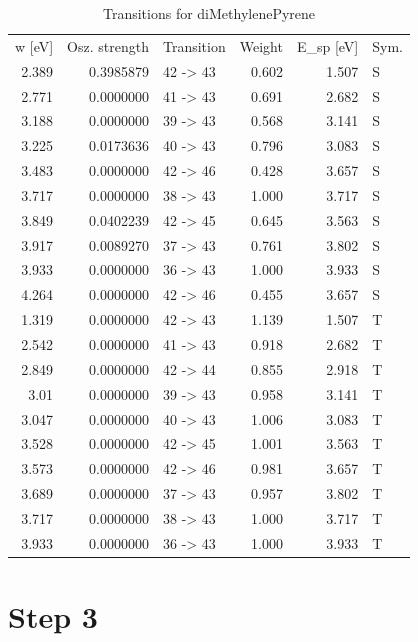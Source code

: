 \begin{table}[htbp]
  \centering
  \caption{Transitions for diMethylenePyrene}
    \begin{tabular}{rrlrrl}
    \multicolumn{1}{l}{w [eV]} & \multicolumn{1}{l}{Osz. strength} & Transition & \multicolumn{1}{l}{Weight} & \multicolumn{1}{l}{E\_sp [eV]} & Sym. \\
    2.389 & 0.3985879 & 42 -> 43 & 0.602 & 1.507 & S \\
    2.771 & 0.0000000 & 41 -> 43 & 0.691 & 2.682 & S \\
    3.188 & 0.0000000 & 39 -> 43 & 0.568 & 3.141 & S \\
    3.225 & 0.0173636 & 40 -> 43 & 0.796 & 3.083 & S \\
    3.483 & 0.0000000 & 42 -> 46 & 0.428 & 3.657 & S \\
    3.717 & 0.0000000 & 38 -> 43 & 1.000 & 3.717 & S \\
    3.849 & 0.0402239 & 42 -> 45 & 0.645 & 3.563 & S \\
    3.917 & 0.0089270 & 37 -> 43 & 0.761 & 3.802 & S \\
    3.933 & 0.0000000 & 36 -> 43 & 1.000 & 3.933 & S \\
    4.264 & 0.0000000 & 42 -> 46 & 0.455 & 3.657 & S \\
    1.319 & 0.0000000 & 42 -> 43 & 1.139 & 1.507 & T \\
    2.542 & 0.0000000 & 41 -> 43 & 0.918 & 2.682 & T \\
    2.849 & 0.0000000 & 42 -> 44 & 0.855 & 2.918 & T \\
    3.01  & 0.0000000 & 39 -> 43 & 0.958 & 3.141 & T \\
    3.047 & 0.0000000 & 40 -> 43 & 1.006 & 3.083 & T \\
    3.528 & 0.0000000 & 42 -> 45 & 1.001 & 3.563 & T \\
    3.573 & 0.0000000 & 42 -> 46 & 0.981 & 3.657 & T \\
    3.689 & 0.0000000 & 37 -> 43 & 0.957 & 3.802 & T \\
    3.717 & 0.0000000 & 38 -> 43 & 1.000 & 3.717 & T \\
    3.933 & 0.0000000 & 36 -> 43 & 1.000 & 3.933 & T \\
    \end{tabular}%
  \label{singulete_triplete}%
\end{table}%




\section{\textbf{Step 3}}


